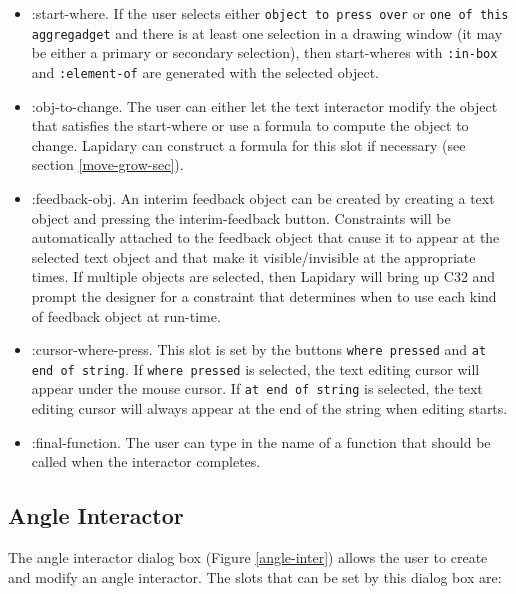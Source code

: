 \begin{itemize}
\item 
:start-where. If the user selects either {\tt object to press over} or
{\tt one of this aggregadget} and there is at least one selection in a drawing
window (it may be either a primary or secondary selection), then start-wheres
with {\tt :in-box} and {\tt :element-of} are generated with the selected
object.



\item :obj-to-change. The user can either let the text interactor modify the
object that satisfies the start-where or use a formula to compute the
object to change.  Lapidary can construct a formula for this slot if
necessary (see section \ref{move-grow-sec}).

\item :feedback-obj. An interim feedback object
can be created by creating a text object and pressing the
interim-feedback button.  Constraints will be automatically attached to
the feedback object that cause it to appear at the selected text object
and that make it visible/invisible at the appropriate times.
If multiple objects are selected, then
Lapidary will bring up C32
and prompt the designer for a constraint that determines when to use each
kind of feedback object at run-time.

\item :cursor-where-press. This slot is set by the buttons {\tt where pressed}
and {\tt at end of string}. If {\tt where pressed} is selected, the
text editing cursor
will appear under the mouse cursor. If {\tt at end of string} is selected,
the text editing cursor will always appear at the end of the string when
editing starts.

\item :final-function. The user can type in the name of a function that should
be called when the interactor completes.

\end{itemize}

\subsection{Angle Interactor}

The angle interactor dialog box (Figure \ref{angle-inter}) allows the user
to create and modify an angle interactor. The slots that can be set by
this dialog box are:

